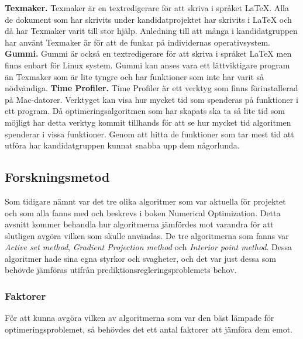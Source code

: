 \newline
\newline
\textbf{Texmaker.} Texmaker är en textredigerare för att skriva i språket \LaTeX. Alla de dokument som har skrivits under kandidatprojektet har skrivits i {\LaTeX} och då har Texmaker varit till stor hjälp. Anledning till att många i kandidatgruppen har använt Texmaker är för att de funkar på individernas operativsystem.
\newline
\newline
\textbf{Gummi.} Gummi är också en textredigerare för att skriva i språket {\LaTeX} men finns enbart för Linux system. Gummi kan anses vara ett lättviktigare program än Texmaker som är lite tyngre och har funktioner som inte har varit så nödvändiga.
\newline
\newline
\textbf{Time Profiler.} Time Profiler är ett verktyg som finns förinstallerad på Mac-datorer. Verktyget kan visa hur mycket tid som spenderas på funktioner i ett program. Då optimeringsalgoritmen som har skapats ska ta så lite tid som möjligt har detta verktyg kommit tillhands för att se hur mycket tid algoritmen spenderar i vissa funktioner. Genom att hitta de funktioner som tar mest tid att utföra har kandidatgruppen kunnat snabba upp dem någorlunda.

\subsection{Forskningsmetod}
Som tidigare nämnt var det tre olika algoritmer som var aktuella för projektet och som alla fanns med och beskrevs i boken Numerical Optimization. Detta avsnitt kommer behandla hur algoritmerna jämfördes mot varandra för att slutligen avgöra vilken som skulle användas.
\newline
\newline
De tre algoritmerna som fanns var \emph{Active set method}, \emph{Gradient Projection method} och \emph{Interior point method}. Dessa algoritmer hade sina egna styrkor och svagheter, och det var just dessa som behövde jämföras utifrån prediktionsregleringsproblemets behov.

\subsubsection{Faktorer}
För att kunna avgöra vilken av algoritmerna som var den bäst lämpade för optimeringsproblemet, så behövdes det ett antal faktorer att jämföra dem emot.


